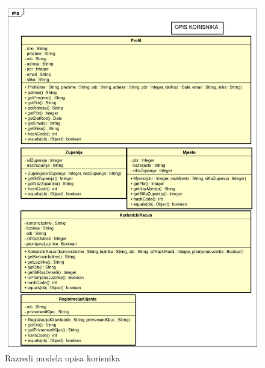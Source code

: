 			\begin{figure}[H]
				\includegraphics[scale=0.54]{Slike/Class Diagram0.PNG}
				\centering
				\caption{Razredi modela opisa korisnika}
				\label{fig:dijagram}
			\end{figure}
		
